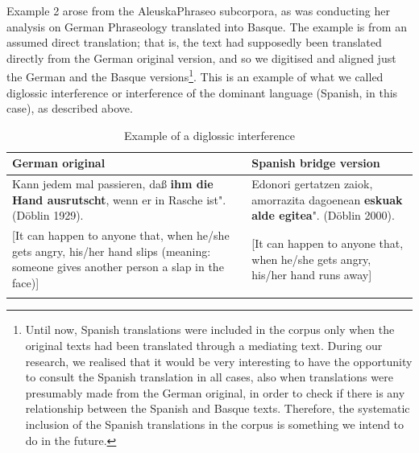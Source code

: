 \documentclass[output=paper]{LSP/langsci}
\begin{document}
Example 2 arose from the AleuskaPhraseo subcorpora, as \citet{Sanz2014} was conducting her analysis on German Phraseology translated into Basque. The example is from an assumed direct translation; that is, the text had supposedly been translated directly from the German original version, and so we digitised and aligned just the German and the Basque versions\footnote{Until now, Spanish translations were included in the corpus only when the original texts had been translated through a mediating text. During our research, we realised that it would be very interesting to have the opportunity to consult the Spanish translation in all cases, also when translations were presumably made from the German original, in order to check if there is any relationship between the Spanish and Basque texts. Therefore, the systematic inclusion of the Spanish translations in the corpus is something we intend to do in the future.}. This is an example of what we called diglossic interference or interference of the dominant language (Spanish, in this case), as described above.

\begin{table}
     \centering
     \begin{tabularx}{\textwidth}{XX}
     \lsptoprule
German original    & Spanish bridge version  \\ 
\midrule
Kann jedem mal passieren, daß \textbf{ihm die Hand ausrutscht}, wenn er in Rasche ist".	(Döblin 1929).   &  Edonori gertatzen zaiok, amorrazita dagoenean \textbf{eskuak alde egitea}". (Döblin 2000).  \\ 
{[}It can happen to anyone that, when he/she gets angry, his/her hand slips (meaning: someone gives another person a slap in the face){]}  & {[}It can happen to anyone that, when he/she gets angry, his/her hand runs away{]}  \\

\lspbottomrule
\end{tabularx}

 \caption{Example of a diglossic interference}
     \label{3.4}
\end{table}     
   
\end{document}
